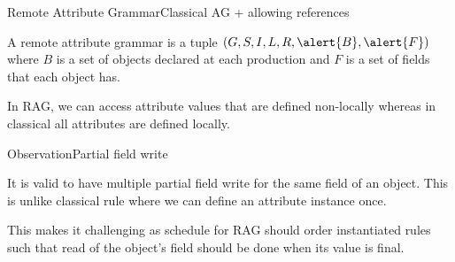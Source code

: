 \begin{frame}{Remote Attribute Grammar}{Classical AG + allowing references}
\begin{definition}
A remote attribute grammar is a tuple $(G,S,I,L,R,\alert{B},\alert{F})$ where \alert{$B$ is a set of objects} declared at each production and \alert{$F$ is a set of fields} that each object has.
\end{definition}

\newlinevspace

In RAG, we can access attribute values that are defined \alert{non-locally} whereas in classical all attributes are defined \alert{locally}.

\end{frame}





\begin{frame}{Observation}{Partial field write}

It is valid to have \alert{multiple partial field write} for the same field of an object. This is \alert{unlike classical rule} where we can define an attribute instance \alert{once}.

\newlinevspace

This makes it challenging as schedule for RAG should order instantiated rules such that \alert{read of the object's field} should be done when its value is \alert{final}. 

\end{frame}



